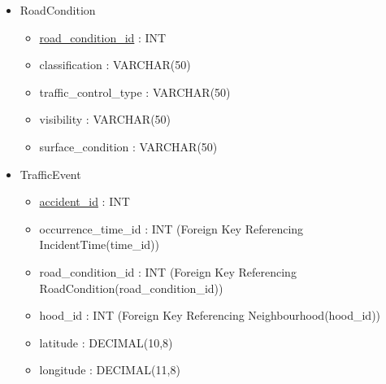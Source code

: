 \documentclass[12pt, a4paper]{article}
\begin{document}
\begin{itemize}
    \item RoadCondition
    \begin{itemize}
        \item \underline{road\_condition\_id} : INT
        \item classification : VARCHAR(50)
        \item traffic\_control\_type : VARCHAR(50)
        \item visibility : VARCHAR(50)
        \item surface\_condition : VARCHAR(50)
    \end{itemize}
    \item TrafficEvent
    \begin{itemize}
        \item \underline{accident\_id} : INT
        \item occurrence\_time\_id : INT (Foreign Key Referencing IncidentTime(time\_id))
        \item road\_condition\_id : INT (Foreign Key Referencing RoadCondition(road\_condition\_id))
        \item hood\_id : INT (Foreign Key Referencing Neighbourhood(hood\_id))
        \item latitude : DECIMAL(10,8)
        \item longitude : DECIMAL(11,8)
    \end{itemize}
\end{itemize}
\color{blue}
\end{document}

